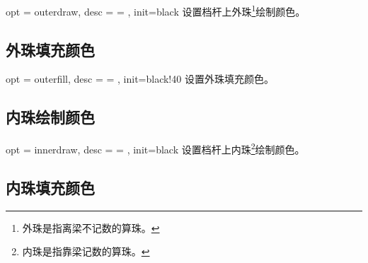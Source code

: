 \documentclass[full]{l3doc}
\begin{document}
\begin{documentation}
\begin{option}{ opt = outerdraw, desc = {= }, init=black }
  设置档杆上外珠\footnote{外珠是指离梁不记数的算珠。}绘制颜色。
\end{option}

\begin{SideBySideExample}[frame=single,numbers=left,%
                xrightmargin=.37\linewidth,gobble=2]
  \centering
  \begin{suanpan}
  \end{suanpan}
\end{SideBySideExample}

\subsection{外珠填充颜色}

\begin{option}{ opt = outerfill, desc = {= }, init=black!40 }
  设置外珠填充颜色。
\end{option}

\begin{SideBySideExample}[frame=single,numbers=left,%
                xrightmargin=.37\linewidth,gobble=2]
  \centering
  \begin{suanpan}
  \end{suanpan}
\end{SideBySideExample}

\subsection{内珠绘制颜色}

\begin{option}{ opt = innerdraw, desc = {= }, init=black }
  设置档杆上内珠\footnote{内珠是指靠梁记数的算珠。}绘制颜色。
\end{option}

\begin{SideBySideExample}[frame=single,numbers=left,%
                xrightmargin=.37\linewidth,gobble=2]
  \centering
  \begin{suanpan}
  \end{suanpan}
\end{SideBySideExample}

\subsection{内珠填充颜色}


\end{documentation}
\end{document}
